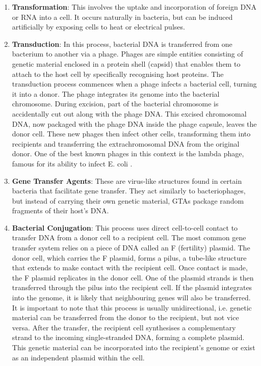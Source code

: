 \begin{enumerate}
      \item \textbf{Transformation}: This involves the uptake and incorporation of foreign \ac{DNA} or RNA into a cell.
            It occurs naturally in bacteria, but can be induced artificially by exposing cells to heat or electrical pulses.
      \item \textbf{Transduction}: In this process, bacterial \ac{DNA} is transferred from one bacterium to another via a phage.
            Phages are simple entities consisting of genetic material enclosed in a protein shell (capsid) that enables them to attach to the host cell by specifically recognising host proteins.
            The transduction process commences when a phage infects a bacterial cell, turning it into a donor.
            The phage integrates its genome into the bacterial chromosome.
            During excision, part of the bacterial chromosome is accidentally cut out along with the phage \ac{DNA}.
            This excised chromosomal \ac{DNA}, now packaged with the phage \ac{DNA} inside the phage capsule, leaves the donor cell.
            These new phages then infect other cells, transforming them into recipients and transferring the extrachromosomal \ac{DNA} from the original donor.
            One of the best known phages in this context is the lambda phage, famous for its ability to infect E. coli \cite{Gen_Molekbio_Schmidt_2023}.
      \item \textbf{Gene Transfer Agents}: These are virus-like structures found in certain bacteria that facilitate gene transfer.
            They act similarly to bacteriophages, but instead of carrying their own genetic material, GTAs package random fragments of their host's \ac{DNA}.
      \item \textbf{Bacterial Conjugation}: This process uses direct cell-to-cell contact to transfer \ac{DNA} from a donor cell to a recipient cell.
            The most common gene transfer system relies on a piece of \ac{DNA} called an F (fertility) plasmid.
            The donor cell, which carries the F plasmid, forms a pilus, a tube-like structure that extends to make contact with the recipient cell.
            Once contact is made, the F plasmid replicates in the donor cell.
            One of the plasmid strands is then transferred through the pilus into the recipient cell.
            If the plasmid integrates into the genome, it is likely that neighbouring genes will also be transferred.
            It is important to note that this process is usually unidirectional,
            i.e. genetic material can be transferred from the donor to the recipient, but not vice versa.
            After the transfer, the recipient cell synthesises a complementary strand to the incoming single-stranded \ac{DNA},
            forming a complete plasmid.
            This genetic material can be incorporated into the recipient's genome or exist as an independent plasmid within the cell.
\end{enumerate}

